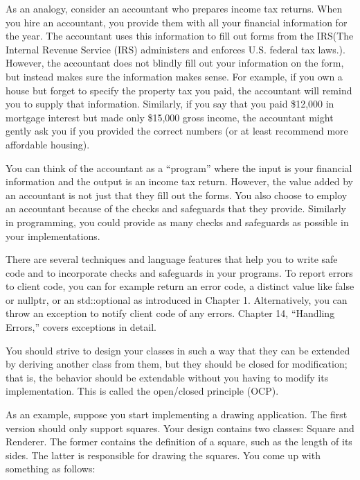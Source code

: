 As an analogy, consider an accountant who prepares income tax returns. When you hire an accountant, you provide them with all your financial information for the year. The accountant uses this information to fill out forms from the IRS(The Internal Revenue Service (IRS) administers and enforces U.S. federal tax laws.). However, the accountant does not blindly fill out your information on the form, but instead makes sure the information makes sense. For example, if you own a house but forget to specify the property tax you paid, the accountant will remind you to supply that information. Similarly, if you say that you paid \$12,000 in mortgage interest but made only \$15,000 gross income, the accountant might gently ask you if you provided the correct numbers (or at least recommend more affordable housing).

You can think of the accountant as a “program” where the input is your financial information and the output is an income tax return. However, the value added by an accountant is not just that they fill out the forms. You also choose to employ an accountant because of the checks and safeguards that they provide. Similarly in programming, you could provide as many checks and safeguards as possible in your implementations.

There are several techniques and language features that help you to write safe code and to incorporate checks and safeguards in your programs. To report errors to client code, you can for example return an error code, a distinct value like false or nullptr, or an std::optional as introduced in Chapter 1. Alternatively, you can throw an exception to notify client code of any errors. Chapter 14, “Handling Errors,” covers exceptions in detail.


You should strive to design your classes in such a way that they can be extended by deriving another class from them, but they should be closed for modification; that is, the behavior should be extendable without you having to modify its implementation. This is called the open/closed principle (OCP).

As an example, suppose you start implementing a drawing application. The first version should only support squares. Your design contains two classes: Square and Renderer. The former contains the definition of a square, such as the length of its sides. The latter is responsible for drawing the squares.
You come up with something as follows:


